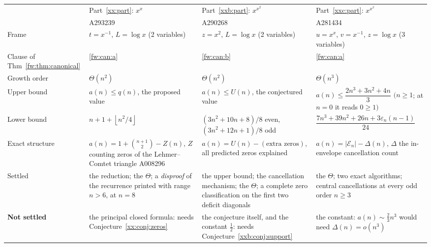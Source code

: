 \documentclass[11pt,a4paper]{article}
\numberwithin{equation}{section}
\theoremstyle{definition}
\theoremstyle{remark}
\theoremstyle{plain}
\newcommand{\EE}{\mathcal E}
\newcommand{\U}{U}
\newcommand{\epsn}{\varepsilon_n}
\begin{document}
\begin{center}
\small
\begin{tabular}{@{}p{}p{}p{}p{}@{}}
\toprule
 & Part~\ref{xx:part}: $x^{x}$ & Part~\ref{xxb:part}: $x^{x^2}$ &
 Part~\ref{xxc:part}: $x^{x^x}$\\
 & A293239 & A290268 & A281434\\
\midrule
Frame &
 $t=x^{-1}$, $L=\log x$ \newline (2 variables) &
 $z=x^{2}$, $L=\log x$ \newline (2 variables) &
 $u=x^{x}$, $v=x^{-1}$, $z=\log x$ \newline (3 variables)\\[4pt]
Clause of Thm~\ref{fw:thm:canonical} &
 \ref{fw:can:a} &
 \ref{fw:can:b} &
 \ref{fw:can:a}\\[4pt]
Growth order &
 $\Theta(n^{2})$ &
 $\Theta(n^{2})$ &
 $\Theta(n^{3})$\\[4pt]
Upper bound &
 $a(n)\le q(n)$, the proposed value &
 $a(n)\le\U(n)$, the conjectured value &
 $a(n)\le\dfrac{2n^{3}+3n^{2}+4n}{3}$ \newline $(n\ge1$; at $n=0$ it reads
 $0\ge1)$\\[4pt]
Lower bound &
 $n+1+\left\lfloor n^{2}/4\right\rfloor$ &
 $(3n^{2}{+}10n{+}8)/8$ even, \newline $(3n^{2}{+}12n{+}1)/8$ odd &
 $\dfrac{7n^{3}{+}39n^{2}{+}26n{+}3\epsn(n{-}1)}{24}$\\[4pt]
Exact structure &
 $a(n)=1+\binom{n+1}{2}-Z(n)$, \newline $Z$ counting zeros of the
 Lehmer--Comtet triangle A008296 &
 $a(n)=\U(n)-(\text{extra zeros})$, all predicted zeros explained &
 $a(n)=|\EE_n|-\Delta(n)$, $\Delta$ the in-envelope cancellation count\\[4pt]
Settled &
 the reduction; the $\Theta$; a \emph{disproof} of the recurrence printed with
 range $n>6$, at $n=8$ &
 the upper bound; the cancellation mechanism; the $\Theta$; a complete zero
 classification on the first two deficit diagonals &
 the $\Theta$; two exact algorithms; central cancellations at every odd
 order $n\ge3$\\[4pt]
\textbf{Not settled} &
 the principal closed formula: needs Conjecture~\ref{xx:conj:zeros} &
 the conjecture itself, and the constant $\tfrac12$: needs
 Conjecture~\ref{xxb:conj:support} &
 the constant: $a(n)\sim\tfrac23n^{3}$ would need $\Delta(n)=o(n^{3})$\\
\bottomrule
\end{tabular}
\end{center}
\end{document}
